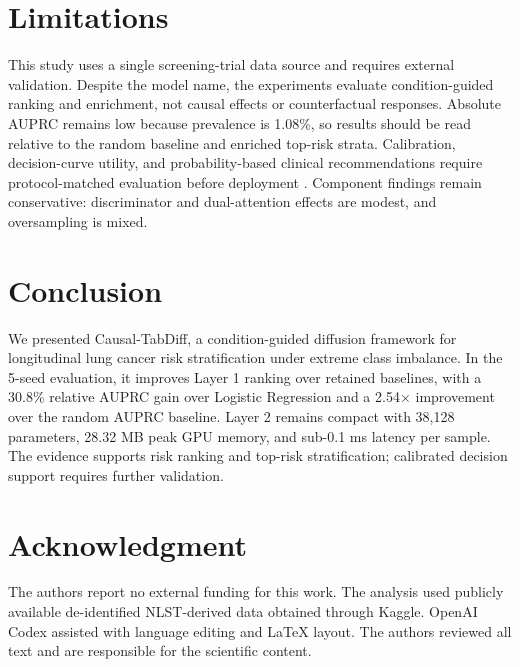\documentclass[11pt,journal,twoside]{IEEEtran}
\begin{document}
\section{Limitations}
\label{sec:limitations}

This study uses a single screening-trial data source and requires external validation. Despite the model name, the experiments evaluate condition-guided ranking and enrichment, not causal effects or counterfactual responses. Absolute AUPRC remains low because prevalence is 1.08\%, so results should be read relative to the random baseline and enriched top-risk strata. Calibration, decision-curve utility, and probability-based clinical recommendations require protocol-matched evaluation before deployment \cite{vickers2006dca,vancalster2019calibration}. Component findings remain conservative: discriminator and dual-attention effects are modest, and oversampling is mixed.

\section{Conclusion}
\label{sec:conclusion}

We presented Causal-TabDiff, a condition-guided diffusion framework for longitudinal lung cancer risk stratification under extreme class imbalance. In the 5-seed evaluation, it improves Layer 1 ranking over retained baselines, with a 30.8\% relative AUPRC gain over Logistic Regression and a 2.54$\times$ improvement over the random AUPRC baseline. Layer 2 remains compact with 38,128 parameters, 28.32 MB peak GPU memory, and sub-0.1 ms latency per sample. The evidence supports risk ranking and top-risk stratification; calibrated decision support requires further validation.

\section*{Acknowledgment}
The authors report no external funding for this work. The analysis used publicly available de-identified NLST-derived data obtained through Kaggle. OpenAI Codex assisted with language editing and \LaTeX{} layout. The authors reviewed all text and are responsible for the scientific content.



\end{document}
